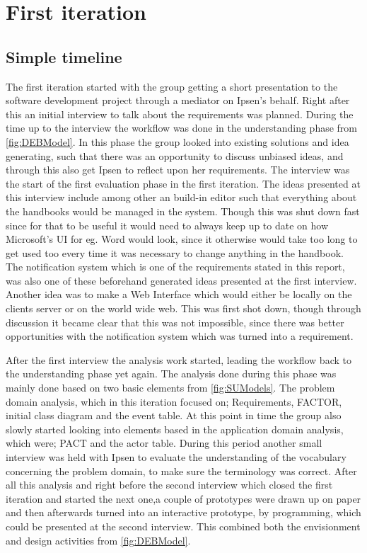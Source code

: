 \section{First iteration}\label{sec:Iteration1}
\subsection{Simple timeline}
The first iteration started with the group getting a short presentation to the software development project through a mediator on Ipsen's behalf.
Right after this an initial interview to talk about the requirements was planned.
During the time up to the interview the workflow was done in the understanding phase from \cref{fig:DEBModel}.
In this phase the group looked into existing solutions and idea generating, such that there was an opportunity to discuss unbiased ideas, and through this also get Ipsen to reflect upon her requirements.
The interview was the start of the first evaluation phase in the first iteration.
The ideas presented at this interview include among other an build-in editor such that everything about the handbooks would be managed in the system.
Though this was shut down fast since for that to be useful it would need to always keep up to date on how Microsoft's UI for eg. Word would look, since it otherwise would take too long to get used too every time it was necessary to change anything in the handbook.
The notification system which is one of the requirements stated in this report, was also one of these beforehand generated ideas presented at the first interview. 
Another idea was to make a Web Interface which would either be locally on the clients server or on the world wide web. This was first shot down, though through discussion it became clear that this was not impossible, since there was better opportunities with the notification system which was turned into a requirement.

After the first interview the analysis work started, leading the workflow back to the understanding phase yet again.
The analysis done during this phase was mainly done based on two basic elements from \cref{fig:SUModels}.
The problem domain analysis, which in this iteration focused on; Requirements, FACTOR, initial class diagram and the event table.
At this point in time the group also slowly started looking into elements based in the application domain analysis, which were; PACT and the actor table.
During this period another small interview was held with Ipsen to evaluate the understanding of the vocabulary concerning the problem domain, to make sure the terminology was correct.
After all this analysis and right before the second interview which closed the first iteration and started the next one,a couple of prototypes were drawn up on paper and then afterwards turned into an interactive prototype, by programming, which could be presented at the second interview.
This combined both the envisionment and design activities from \cref{fig:DEBModel}.

